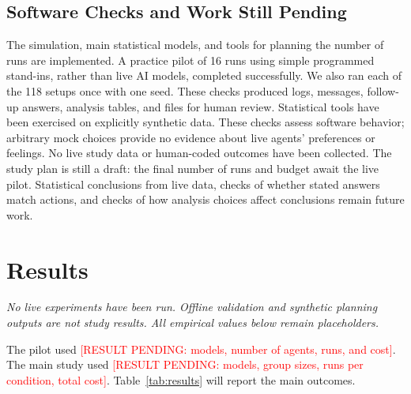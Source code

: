 \documentclass[conference]{IEEEtran}
\newcommand{\RESULT}[1]{\textcolor{red}{[RESULT PENDING: #1]}}
\begin{document}
\subsection{Software Checks and Work Still Pending}

The simulation, main statistical models, and tools for planning the number of runs are implemented. A practice pilot of 16 runs using simple programmed stand-ins, rather than live AI models, completed successfully. We also ran each of the 118 setups once with one seed. These checks produced logs, messages, follow-up answers, analysis tables, and files for human review. Statistical tools have been exercised on explicitly synthetic data. These checks assess software behavior; arbitrary mock choices provide no evidence about live agents' preferences or feelings. No live study data or human-coded outcomes have been collected. The study plan is still a draft: the final number of runs and budget await the live pilot. Statistical conclusions from live data, checks of whether stated answers match actions, and checks of how analysis choices affect conclusions remain future work.

\section{Results}
\label{sec:results}

\emph{No live experiments have been run. Offline validation and synthetic planning outputs are not study results. All empirical values below remain placeholders.}

The pilot used \RESULT{models, number of agents, runs, and cost}. The main study used \RESULT{models, group sizes, runs per condition, total cost}. Table~\ref{tab:results} will report the main outcomes.
\end{document}
